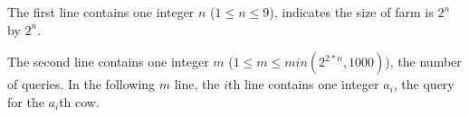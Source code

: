 The first line contains one integer $n$ ($1 \le n \le 9$), indicates the size of farm is $2^n$ by $2^n$.

The second line contains one integer $m$ ($1 \le m \le min(2^{2*n}, 1000)$), the number of queries.
In the following $m$ line, the $i$th line contains one integer $a_i$, the query for the $a_i$th cow.

